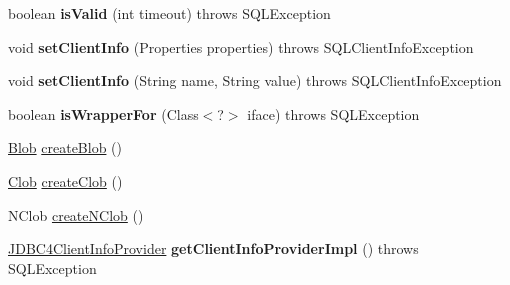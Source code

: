 \begin{DoxyCompactItemize}
\item 
\mbox{\label{classcom_1_1mysql_1_1jdbc_1_1_j_d_b_c4_multi_host_my_s_q_l_connection_a74aafd870fa62b7f7dc49735b70c4012}} 
boolean {\bfseries is\+Valid} (int timeout)  throws S\+Q\+L\+Exception 
\item 
\mbox{\label{classcom_1_1mysql_1_1jdbc_1_1_j_d_b_c4_multi_host_my_s_q_l_connection_a3bad88839bb8d4e720390c5f36cefd18}} 
void {\bfseries set\+Client\+Info} (Properties properties)  throws S\+Q\+L\+Client\+Info\+Exception 
\item 
\mbox{\label{classcom_1_1mysql_1_1jdbc_1_1_j_d_b_c4_multi_host_my_s_q_l_connection_ae4731e9cea705a787cb4c506cc3e1ba7}} 
void {\bfseries set\+Client\+Info} (String name, String value)  throws S\+Q\+L\+Client\+Info\+Exception 
\item 
\mbox{\label{classcom_1_1mysql_1_1jdbc_1_1_j_d_b_c4_multi_host_my_s_q_l_connection_aa4762e587c3dd777d8627a38ded1abfc}} 
boolean {\bfseries is\+Wrapper\+For} (Class$<$?$>$ iface)  throws S\+Q\+L\+Exception 
\item 
\mbox{\hyperlink{classcom_1_1mysql_1_1jdbc_1_1_blob}{Blob}} \mbox{\hyperlink{classcom_1_1mysql_1_1jdbc_1_1_j_d_b_c4_multi_host_my_s_q_l_connection_a2d54b8466c4df2be2aaba7f8c44cfbdf}{create\+Blob}} ()
\item 
\mbox{\hyperlink{classcom_1_1mysql_1_1jdbc_1_1_clob}{Clob}} \mbox{\hyperlink{classcom_1_1mysql_1_1jdbc_1_1_j_d_b_c4_multi_host_my_s_q_l_connection_a7cb5c2e81f0ede111146720c6d1bc6ba}{create\+Clob}} ()
\item 
N\+Clob \mbox{\hyperlink{classcom_1_1mysql_1_1jdbc_1_1_j_d_b_c4_multi_host_my_s_q_l_connection_a1d465e43c68df080280c241cf3b29c9c}{create\+N\+Clob}} ()
\item 
\mbox{\label{classcom_1_1mysql_1_1jdbc_1_1_j_d_b_c4_multi_host_my_s_q_l_connection_ae6f2a14d40acb9ce56c9b0d2e026243b}} 
\mbox{\hyperlink{interfacecom_1_1mysql_1_1jdbc_1_1_j_d_b_c4_client_info_provider}{J\+D\+B\+C4\+Client\+Info\+Provider}} {\bfseries get\+Client\+Info\+Provider\+Impl} ()  throws S\+Q\+L\+Exception 
\end{DoxyCompactItemize}
